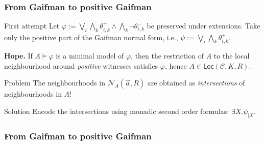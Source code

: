 \documentclass{beamer}
\begin{document}
\subsubsection{From Gaifman to positive
Gaifman}\label{from-gaifman-to-positive-gaifman}

\begin{frame}{First attempt}
\protect\hypertarget{first-attempt}{}
Let
\(\varphi := \bigvee_i \bigwedge_k \theta_{i,k}^+ \wedge \bigwedge_k \neg \theta_{i,k}^-\)
be preserved under extensions. Take only the positive part of the
Gaifman normal form, i.e.,
\(\psi := \bigvee_i \bigwedge_k \theta_{i,k}^+\).

\textbf{Hope.} If \(A \models \varphi\) is a minimal model of
\(\varphi\), then the restriction of \(A\) to the local neighbourhood
around \emph{positive} witnesses satisfies \(\varphi\), hence
\(A \in \mathsf{Loc}(\mathcal{C},K, R)\).
\end{frame}

\begin{frame}{Problem}
\protect\hypertarget{problem}{}
The neighbourhoods in \(\mathcal{N}_{A}(\vec{a}, R)\) are obtained as
\emph{intersections} of neighbourhoods in \(A\)!
\end{frame}

\begin{frame}{Solution}
\protect\hypertarget{solution}{}
Encode the intersections using monadic second order formulas:
\(\exists X. \psi_{|X}\).
\end{frame}

\subsubsection{From Gaifman to positive
Gaifman}\label{from-gaifman-to-positive-gaifman-1}
\end{document}

